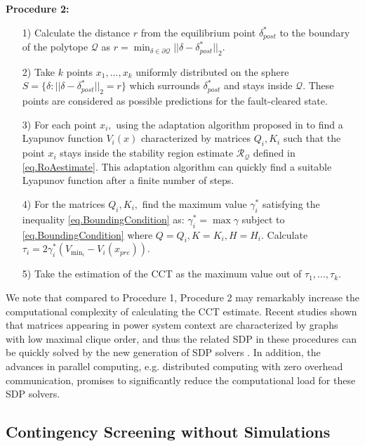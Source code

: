 \documentclass[final]{IEEEtran}
\begin{document}
\textbf{Procedure 2:}
\begin{itemize}
\item [1)] Calculate the distance $r$ from the equilibrium point $\delta^*_{post}$ to the boundary of the polytope $\mathcal{Q}$ as $r=\min_{\delta \in \partial \mathcal{Q}}||\delta-\delta^*_{post}||_2.$
\item [2)] Take $k$ points $x_1,...,x_k$ uniformly distributed on the sphere $S=\{\delta: ||\delta-\delta^*_{post}||_2=r\}$ which surrounds $\delta^*_{post}$ and stays inside $\mathcal{Q}.$ These points are considered as possible predictions for the fault-cleared state.
\item [3)] For each point $x_i,$ using the adaptation algorithm proposed in \cite{Vu:2014} to find a Lyapunov function $V_i(x)$ characterized by matrices $Q_i,K_i$ such that the point $x_i$ stays inside the stability region estimate $\mathcal{R_Q}$ defined in \eqref{eq.RoAestimate}. This adaptation algorithm can quickly find a suitable Lyapunov function after a finite number of steps.
\item [4)] For the matrices $Q_i,K_i,$ find the maximum value $\gamma^*_i$ satisfying the inequality \eqref{eq.BoundingCondition} as: $\gamma^*_i=\max \gamma$ subject to \eqref{eq.BoundingCondition} where $Q=Q_i,K=K_i,H=H_i$. Calculate $\tau_i =2\gamma^*_i (V_{{\min}_i}-V_i(x_{pre})).$
\item [5)] Take the estimation of the CCT as the maximum value out of $\tau_1,...,\tau_k.$
\end{itemize}

We note that compared to Procedure 1, Procedure 2 may remarkably
increase the computational complexity of calculating the CCT
estimate. Recent studies shown that matrices appearing in power
system context are characterized by graphs with low maximal clique
order, and thus the related SDP in these procedures can be quickly
solved by the new generation of SDP solvers
\cite{Javadmadani2014sdp, Jabr2012}. In addition, the advances in
parallel computing, e.g. distributed computing with zero overhead
communication, promises to significantly reduce the computational
load for these SDP solvers.





\subsection{Contingency Screening without Simulations}
\end{document}
